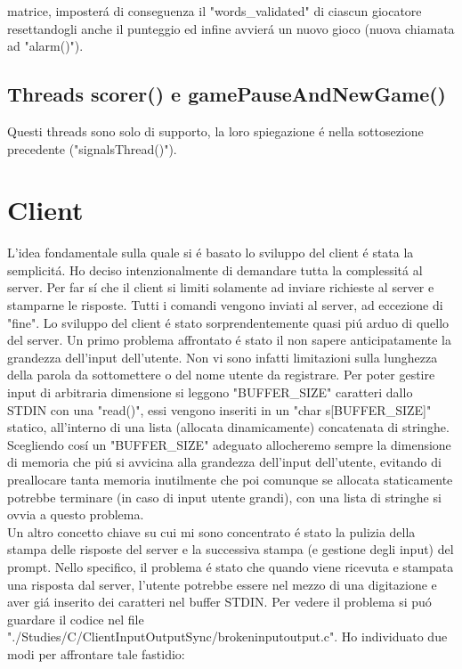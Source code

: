 matrice, imposter\'a di conseguenza il "words\_validated" di ciascun giocatore resettandogli anche il punteggio ed infine avvier\'a un nuovo gioco (nuova chiamata ad "alarm()").
 
 \subsection{Threads scorer() e gamePauseAndNewGame()}
 
 Questi threads sono solo di supporto, la loro spiegazione \'e nella sottosezione precedente ("signalsThread()").

\section{Client}
L'idea fondamentale sulla quale si \'e basato lo sviluppo del client \'e stata la semplicit\'a. Ho deciso intenzionalmente di demandare tutta la complessit\'a al server. Per far s\'i che il client si limiti solamente ad inviare richieste al server e stamparne le risposte. Tutti i  comandi vengono inviati al server, ad eccezione di "fine". Lo sviluppo del client \'e stato sorprendentemente quasi pi\'u arduo di quello del server. Un primo problema affrontato \'e stato il non sapere anticipatamente la grandezza dell'input dell'utente. Non vi sono infatti limitazioni sulla lunghezza della parola da sottomettere o del nome utente da registrare. Per poter gestire input di arbitraria dimensione si leggono "BUFFER\_SIZE" caratteri dallo STDIN con una "read()", essi vengono inseriti in un "char s[BUFFER\_SIZE]" statico, all'interno di una lista (allocata dinamicamente) concatenata di stringhe. Scegliendo cos\'i un "BUFFER\_SIZE" adeguato allocheremo sempre la dimensione di memoria che pi\'u si avvicina alla grandezza dell'input dell'utente, evitando di preallocare tanta memoria inutilmente che poi comunque se allocata staticamente potrebbe terminare (in caso di input utente grandi), con una lista di stringhe si ovvia a questo problema.
\\
Un altro concetto chiave su cui mi sono concentrato \'e stato la pulizia della stampa delle risposte del server e la successiva stampa (e gestione degli input) del prompt. Nello specifico, il problema \'e stato che quando viene ricevuta e stampata una risposta dal server, l'utente potrebbe essere nel mezzo di una digitazione e aver gi\'a inserito dei caratteri nel buffer STDIN. Per vedere il problema si pu\'o guardare il codice nel file "./Studies/C/ClientInputOutputSync/brokeninputoutput.c". Ho individuato due modi per affrontare tale fastidio:
